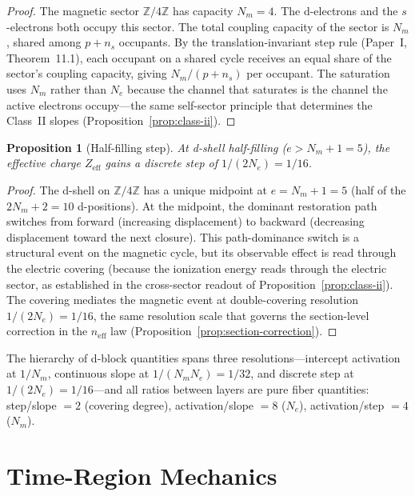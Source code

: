 \documentclass[11pt,a4paper]{article}
\newtheorem{proposition}[theorem]{Proposition}
\begin{document}
\begin{proof}
The magnetic sector $\mathbb{Z}/4\mathbb{Z}$ has capacity $N_m = 4$. The d-electrons and the $s$-electrons both occupy this sector. The total coupling capacity of the sector is $N_m$, shared among $p + n_s$ occupants. By the translation-invariant step rule (Paper~I, Theorem~11.1), each occupant on a shared cycle receives an equal share of the sector's coupling capacity, giving $N_m/(p + n_s)$ per occupant. The saturation uses $N_m$ rather than $N_e$ because the channel that saturates is the channel the active electrons occupy---the same self-sector principle that determines the Class~II slopes (Proposition~\ref{prop:class-ii}).
\end{proof}

\begin{proposition}[Half-filling step]
\label{prop:half-filling}
At d-shell half-filling ($e > N_m + 1 = 5$), the effective charge $Z_{\mathrm{eff}}$ gains a discrete step of $1/(2N_e) = 1/16$.
\end{proposition}

\begin{proof}
The d-shell on $\mathbb{Z}/4\mathbb{Z}$ has a unique midpoint at $e = N_m + 1 = 5$ (half of the $2N_m + 2 = 10$ d-positions). At the midpoint, the dominant restoration path switches from forward (increasing displacement) to backward (decreasing displacement toward the next closure). This path-dominance switch is a structural event on the magnetic cycle, but its observable effect is read through the electric covering (because the ionization energy reads through the electric sector, as established in the cross-sector readout of Proposition~\ref{prop:class-ii}). The covering mediates the magnetic event at double-covering resolution $1/(2N_e) = 1/16$, the same resolution scale that governs the section-level correction in the $n_{\mathrm{eff}}$ law (Proposition~\ref{prop:section-correction}).
\end{proof}

The hierarchy of d-block quantities spans three resolutions---intercept activation at $1/N_m$, continuous slope at $1/(N_m N_e) = 1/32$, and discrete step at $1/(2N_e) = 1/16$---and all ratios between layers are pure fiber quantities: step/slope $= 2$ (covering degree), activation/slope $= 8$ ($N_e$), activation/step $= 4$ ($N_m$).

\section{Time-Region Mechanics}
\label{sec:time-region}
\end{document}
